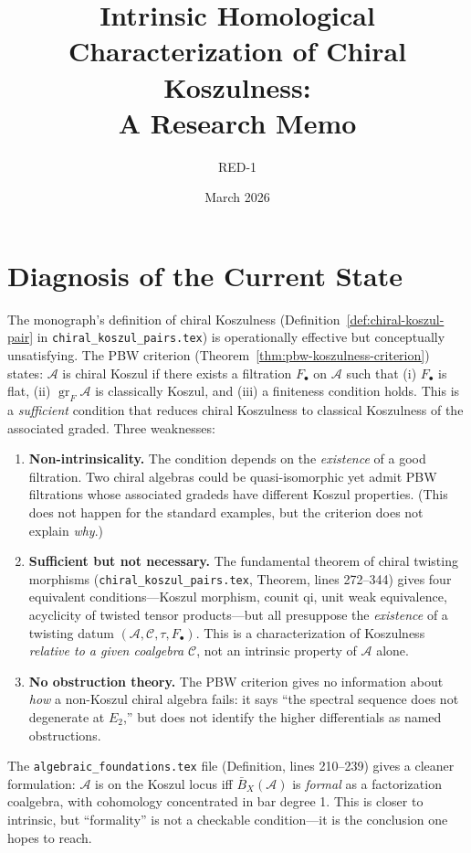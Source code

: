 \documentclass[11pt]{article}
\title{Intrinsic Homological Characterization of Chiral Koszulness:\\
A Research Memo}
\author{RED-1}
\date{March 2026}
\theoremstyle{remark}
\newcommand{\cA}{\mathcal{A}}
\newcommand{\cC}{\mathcal{C}}
\newcommand{\barB}{\bar{B}}
\newcommand{\gr}{\operatorname{gr}}
\begin{document}
\maketitle

\section{Diagnosis of the Current State}

The monograph's definition of chiral Koszulness (Definition~\ref*{def:chiral-koszul-pair} in \texttt{chiral\_koszul\_pairs.tex}) is operationally effective but conceptually unsatisfying.  The PBW criterion (Theorem~\ref*{thm:pbw-koszulness-criterion}) states: $\cA$ is chiral Koszul if there exists a filtration $F_\bullet$ on $\cA$ such that (i) $F_\bullet$ is flat, (ii) $\gr_F \cA$ is classically Koszul, and (iii) a finiteness condition holds.  This is a \emph{sufficient} condition that reduces chiral Koszulness to classical Koszulness of the associated graded.  Three weaknesses:

\begin{enumerate}[label=(\arabic*)]
\item \textbf{Non-intrinsicality.}  The condition depends on the \emph{existence} of a good filtration.  Two chiral algebras could be quasi-isomorphic yet admit PBW filtrations whose associated gradeds have different Koszul properties.  (This does not happen for the standard examples, but the criterion does not explain \emph{why}.)

\item \textbf{Sufficient but not necessary.}  The fundamental theorem of chiral twisting morphisms (\texttt{chiral\_koszul\_pairs.tex}, Theorem, lines 272--344) gives four equivalent conditions---Koszul morphism, counit qi, unit weak equivalence, acyclicity of twisted tensor products---but all presuppose the \emph{existence} of a twisting datum $(\cA, \cC, \tau, F_\bullet)$.  This is a characterization of Koszulness \emph{relative to a given coalgebra $\cC$}, not an intrinsic property of $\cA$ alone.

\item \textbf{No obstruction theory.}  The PBW criterion gives no information about \emph{how} a non-Koszul chiral algebra fails: it says ``the spectral sequence does not degenerate at $E_2$,'' but does not identify the higher differentials as named obstructions.
\end{enumerate}

The \texttt{algebraic\_foundations.tex} file (Definition, lines 210--239) gives a cleaner formulation: $\cA$ is on the Koszul locus iff $\barB_X(\cA)$ is \emph{formal} as a factorization coalgebra, with cohomology concentrated in bar degree 1.  This is closer to intrinsic, but ``formality'' is not a checkable condition---it is the conclusion one hopes to reach.
\end{document}
